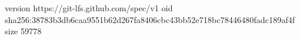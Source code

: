 version https://git-lfs.github.com/spec/v1
oid sha256:38783b3db6caa9551b62d267fa8406cbc43bb52e718bc78446480fadc189af4f
size 59778

